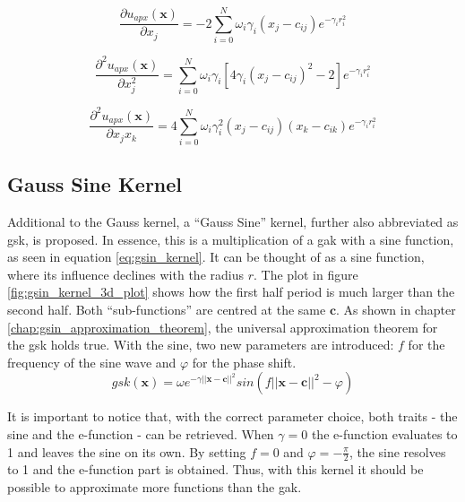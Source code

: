 \documentclass[./\jobname.tex]{subfiles}
\begin{document}
\begin{equation}
\label{eq:uapx_gauss_kernel_x0}
\frac{\partial u_{apx}(\mathbf{x})}{\partial x_j} = -2 \sum_{i=0}^{N} \omega_i \gamma_i (x_j - c_{ij}) e^{-\gamma_i r_i^2}
\end{equation}

\begin{equation}
\label{eq:uapx_gauss_kernel_x0x0}
\frac{\partial^2 u_{apx}(\mathbf{x})}{\partial x_j^2} = \sum_{i=0}^{N} \omega_i \gamma_i \left[ 4 \gamma_i (x_j - c_{ij})^2 - 2 \right] e^{-\gamma_i r_i^2}
\end{equation}

\begin{equation}
\label{eq:uapx_gauss_kernel_x0x1}
\frac{\partial^2 u_{apx}(\mathbf{x})}{\partial x_j x_k} = 4 \sum_{i=0}^{N} \omega_i \gamma_i^2 (x_j - c_{ij}) (x_k - c_{ik}) e^{-\gamma_i r_i^2} 
\end{equation}

\subsection{Gauss Sine Kernel}
\label{chap:gsin_kernel}
Additional to the Gauss kernel, a ``Gauss Sine'' kernel, further also abbreviated as \gls{gsk}, is proposed. In essence, this is a multiplication of a \gls{gak} with a sine function, as seen in equation \eqref{eq:gsin_kernel}. It can be thought of as a sine function, where its influence declines with the radius $r$. The plot in figure \ref{fig:gsin_kernel_3d_plot} shows how the first half period is much larger than the second half. Both ``sub-functions'' are centred at the same $\mathbf{c}$. As shown in chapter \ref{chap:gsin_approximation_theorem}, the universal approximation theorem for the \gls{gsk} holds true. 
With the sine, two new parameters are introduced: $f$ for the frequency of the sine wave and $\varphi$ for the phase shift. 
\begin{equation}
\label{eq:gsin_kernel}
gsk(\mathbf{x}) = \omega e^{-\gamma ||\mathbf{x} - \mathbf{c}||^2} sin(f ||\mathbf{x} - \mathbf{c}||^2 - \varphi)
\end{equation}

It is important to notice that, with the correct parameter choice, both traits - the sine and the e-function - can be retrieved. When $\gamma=0$ the e-function evaluates to 1 and leaves the sine on its own. By setting $f=0$ and $\varphi=-\frac{\pi}{2}$, the sine resolves to 1 and the e-function part is obtained. Thus, with this kernel it should be possible to approximate more functions than the \gls{gak}. 
\end{document}
